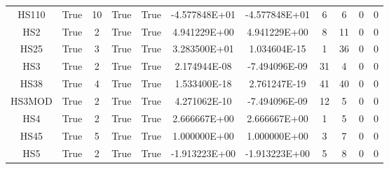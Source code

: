 \begin{longtable}{ccccccccccc}
	\cellcolor{default1} HS110& \cellcolor{default1} True& \cellcolor{default1} 10& \cellcolor{default1} True& \cellcolor{default1} True& \cellcolor{ok} -4.577848E+01& \cellcolor{best} -4.577848E+01& \cellcolor{best} 6& \cellcolor{best} 6& \cellcolor{default1} 0& \cellcolor{default1} 0\\
	\cellcolor{default2} HS2& \cellcolor{default2} True& \cellcolor{default2} 2& \cellcolor{default2} True& \cellcolor{default2} True& \cellcolor{ok} 4.941229E+00& \cellcolor{best} 4.941229E+00& \cellcolor{best} 8& \cellcolor{ok} 11& \cellcolor{default2} 0& \cellcolor{default2} 0\\
	\cellcolor{default1} HS25& \cellcolor{default1} True& \cellcolor{default1} 3& \cellcolor{default1} True& \cellcolor{default1} True& \cellcolor{poor} 3.283500E+01& \cellcolor{best} 1.034604E-15& \cellcolor{best} 1& \cellcolor{poor} 36& \cellcolor{default1} 0& \cellcolor{default1} 0\\
	\cellcolor{default2} HS3& \cellcolor{default2} True& \cellcolor{default2} 2& \cellcolor{default2} True& \cellcolor{default2} True& \cellcolor{ok} 2.174944E-08& \cellcolor{best} -7.494096E-09& \cellcolor{poor} 31& \cellcolor{best} 4& \cellcolor{default2} 0& \cellcolor{default2} 0\\
	\cellcolor{default1} HS38& \cellcolor{default1} True& \cellcolor{default1} 4& \cellcolor{default1} True& \cellcolor{default1} True& \cellcolor{ok} 1.533400E-18& \cellcolor{best} 2.761247E-19& \cellcolor{ok} 41& \cellcolor{best} 40& \cellcolor{default1} 0& \cellcolor{default1} 0\\
	\cellcolor{default2} HS3MOD& \cellcolor{default2} True& \cellcolor{default2} 2& \cellcolor{default2} True& \cellcolor{default2} True& \cellcolor{ok} 4.271062E-10& \cellcolor{best} -7.494096E-09& \cellcolor{poor} 12& \cellcolor{best} 5& \cellcolor{default2} 0& \cellcolor{default2} 0\\
	\cellcolor{default1} HS4& \cellcolor{default1} True& \cellcolor{default1} 2& \cellcolor{default1} True& \cellcolor{default1} True& \cellcolor{best} 2.666667E+00& \cellcolor{ok} 2.666667E+00& \cellcolor{best} 1& \cellcolor{poor} 5& \cellcolor{default1} 0& \cellcolor{default1} 0\\
	\cellcolor{default2} HS45& \cellcolor{default2} True& \cellcolor{default2} 5& \cellcolor{default2} True& \cellcolor{default2} True& \cellcolor{ok} 1.000000E+00& \cellcolor{best} 1.000000E+00& \cellcolor{best} 3& \cellcolor{poor} 7& \cellcolor{default2} 0& \cellcolor{default2} 0\\
	\cellcolor{default1} HS5& \cellcolor{default1} True& \cellcolor{default1} 2& \cellcolor{default1} True& \cellcolor{default1} True& \cellcolor{ok} -1.913223E+00& \cellcolor{best} -1.913223E+00& \cellcolor{best} 5& \cellcolor{ok} 8& \cellcolor{default1} 0& \cellcolor{default1} 0\\

\end{longtable}
